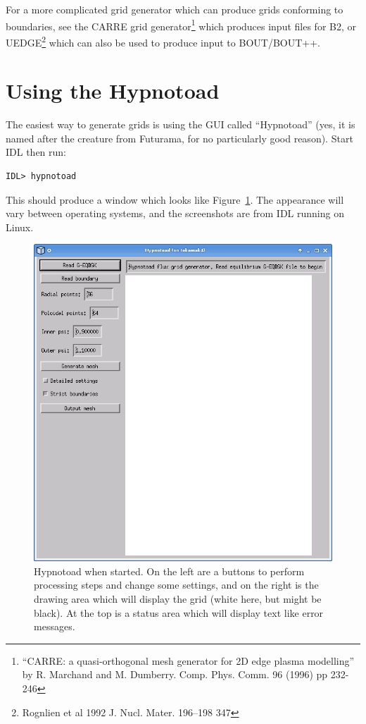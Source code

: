 \documentclass[12pt, a4paper]{article}
\begin{document}
For a more complicated grid generator which can produce grids conforming
to boundaries, see the CARRE grid generator\footnote{``CARRE: a
quasi-orthogonal mesh generator for 2D edge plasma modelling'' by R. Marchand
and M. Dumberry. Comp. Phys. Comm. 96 (1996) pp 232-246} which produces
input files for B2, or UEDGE\footnote{Rognlien et al 1992 J. Nucl. Mater. 196–198 347} which can also be used to produce input to BOUT/BOUT++.

\section{Using the Hypnotoad}

The easiest way to generate grids is using the GUI called ``Hypnotoad''
(yes, it is named after the creature from Futurama, for no particularly good reason). Start IDL then run:
\begin{verbatim}
IDL> hypnotoad
\end{verbatim}
This should produce a window which looks like Figure~\ref{fig:screen_0}.
The appearance will vary between operating systems, and the screenshots
are from IDL running on Linux.
\begin{figure}[hp!]
  \centering
  \includegraphics[width=0.5\paperwidth, keepaspectratio]{screen_0.png}
  \caption{Hypnotoad when started. On the left are a buttons to perform
    processing steps and change some settings,
    and on the right is the drawing area which will display the grid (white
    here, but might be black).
    At the top is a status area which will display text like error messages.}
  \label{fig:screen_0}
\end{figure}
\clearpage
\end{document}

